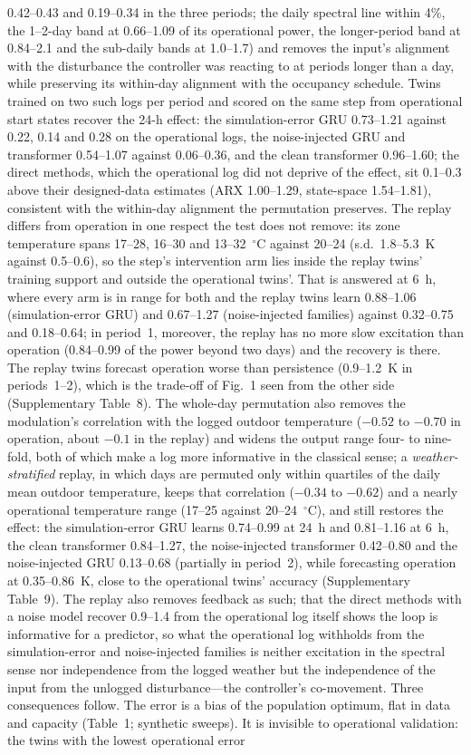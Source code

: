 \documentclass[11pt]{article}
\begin{document}
0.42--0.43 and 0.19--0.34 in the three periods; the daily spectral line within 4\%, the 1--2-day band at 0.66--1.09 of its operational power, the longer-period band at 0.84--2.1 and the sub-daily bands at 1.0--1.7) and removes the input's alignment with the disturbance the controller was reacting to at periods longer than a day, while preserving its within-day alignment with the occupancy schedule. Twins trained on two such logs per period and scored on the same step from operational start states recover the 24-h effect: the simulation-error GRU 0.73--1.21 against 0.22, 0.14 and 0.28 on the operational logs, the noise-injected GRU and transformer 0.54--1.07 against 0.06--0.36, and the clean transformer 0.96--1.60; the direct methods, which the operational log did not deprive of the effect, sit 0.1--0.3 above their designed-data estimates (ARX 1.00--1.29, state-space 1.54--1.81), consistent with the within-day alignment the permutation preserves. The replay differs from operation in one respect the test does not remove: its zone temperature spans 17--28, 16--30 and 13--32~$^\circ$C against 20--24 (s.d.\ 1.8--5.3~K against 0.5--0.6), so the step's intervention arm lies inside the replay twins' training support and outside the operational twins'. That is answered at 6~h, where every arm is in range for both and the replay twins learn 0.88--1.06 (simulation-error GRU) and 0.67--1.27 (noise-injected families) against 0.32--0.75 and 0.18--0.64; in period~1, moreover, the replay has no more slow excitation than operation (0.84--0.99 of the power beyond two days) and the recovery is there. The replay twins forecast operation worse than persistence (0.9--1.2~K in periods~1--2), which is the trade-off of Fig.~1 seen from the other side (Supplementary Table~8). The whole-day permutation also removes the modulation's correlation with the logged outdoor temperature ($-0.52$ to $-0.70$ in operation, about $-0.1$ in the replay) and widens the output range four- to nine-fold, both of which make a log more informative in the classical sense; a \emph{weather-stratified} replay, in which days are permuted only within quartiles of the daily mean outdoor temperature, keeps that correlation ($-0.34$ to $-0.62$) and a nearly operational temperature range (17--25 against 20--24~$^\circ$C), and still restores the effect: the simulation-error GRU learns 0.74--0.99 at 24~h and 0.81--1.16 at 6~h, the clean transformer 0.84--1.27, the noise-injected transformer 0.42--0.80 and the noise-injected GRU 0.13--0.68 (partially in period~2), while forecasting operation at 0.35--0.86~K, close to the operational twins' accuracy (Supplementary Table~9). The replay also removes feedback as such; that the direct methods with a noise model recover 0.9--1.4 from the operational log itself shows the loop is informative for a predictor, so what the operational log withholds from the simulation-error and noise-injected families is neither excitation in the spectral sense nor independence from the logged weather but the independence of the input from the unlogged disturbance---the controller's co-movement. Three consequences follow. The error is a bias of the population optimum, flat in data and capacity (Table~1; synthetic sweeps). It is invisible to operational validation: the twins with the lowest operational error 
\end{document}

